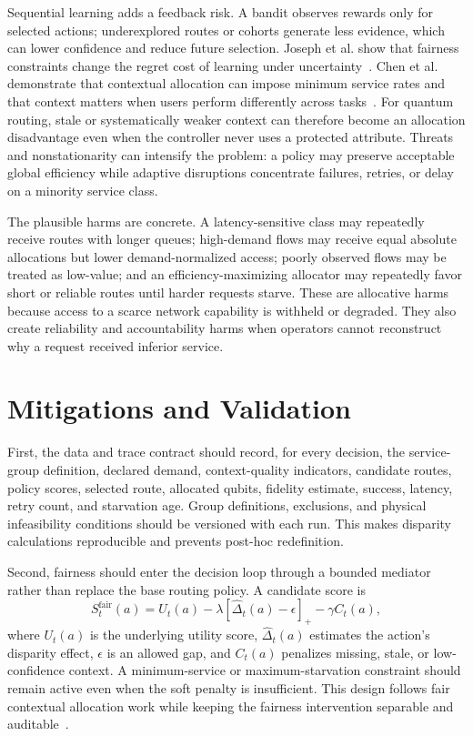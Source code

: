 \documentclass[10pt,conference]{IEEEtran}
\begin{document}
Sequential learning adds a feedback risk. A bandit observes rewards only for selected actions; underexplored routes or cohorts generate less evidence, which can lower confidence and reduce future selection. Joseph et al. show that fairness constraints change the regret cost of learning under uncertainty~\cite{joseph2016fairness}. Chen et al. demonstrate that contextual allocation can impose minimum service rates and that context matters when users perform differently across tasks~\cite{chen2020fair}. For quantum routing, stale or systematically weaker context can therefore become an allocation disadvantage even when the controller never uses a protected attribute. Threats and nonstationarity can intensify the problem: a policy may preserve acceptable global efficiency while adaptive disruptions concentrate failures, retries, or delay on a minority service class.

The plausible harms are concrete. A latency-sensitive class may repeatedly receive routes with longer queues; high-demand flows may receive equal absolute allocations but lower demand-normalized access; poorly observed flows may be treated as low-value; and an efficiency-maximizing allocator may repeatedly favor short or reliable routes until harder requests starve. These are allocative harms because access to a scarce network capability is withheld or degraded. They also create reliability and accountability harms when operators cannot reconstruct why a request received inferior service.

\section{Mitigations and Validation}

First, the data and trace contract should record, for every decision, the service-group definition, declared demand, context-quality indicators, candidate routes, policy scores, selected route, allocated qubits, fidelity estimate, success, latency, retry count, and starvation age. Group definitions, exclusions, and physical infeasibility conditions should be versioned with each run. This makes disparity calculations reproducible and prevents post-hoc redefinition.

Second, fairness should enter the decision loop through a bounded mediator rather than replace the base routing policy. A candidate score is
\begin{equation}
 S_t^{\mathrm{fair}}(a)=U_t(a)-\lambda[\widehat{\Delta}_t(a)-\epsilon]_+-\gamma C_t(a),
\end{equation}
where $U_t(a)$ is the underlying utility score, $\widehat{\Delta}_t(a)$ estimates the action's disparity effect, $\epsilon$ is an allowed gap, and $C_t(a)$ penalizes missing, stale, or low-confidence context. A minimum-service or maximum-starvation constraint should remain active even when the soft penalty is insufficient. This design follows fair contextual allocation work while keeping the fairness intervention separable and auditable~\cite{chen2020fair}.
\end{document}
